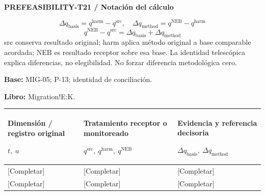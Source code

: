\Needspace{112mm}
\par\begingroup\sffamily\fontsize{8}{10}\selectfont\color{NEBGreen}\setlength{\parskip}{2pt}\setlength{\abovedisplayskip}{4pt}\setlength{\belowdisplayskip}{4pt}\setlength{\abovedisplayshortskip}{2pt}\setlength{\belowdisplayshortskip}{3pt}
\textbf{PREFEASIBILITY-T21 / Notación del cálculo}\par
{\fontsize{9}{11}\selectfont\[ \Delta q_{\mathrm{basis}}=q^{\mathrm{harm}}-q^{\mathrm{src}},\quad \Delta q_{\mathrm{method}}=q^{\mathrm{NEB}}-q^{\mathrm{harm}} \]}
{\fontsize{9}{11}\selectfont\[ q^{\mathrm{NEB}}-q^{\mathrm{src}}=\Delta q_{\mathrm{basis}}+\Delta q_{\mathrm{method}} \]}
src conserva resultado original; harm aplica método original a base comparable acordada; NEB es resultado receptor sobre esa base. La identidad telescópica explica diferencias, no elegibilidad. No forzar diferencia metodológica cero.\par
\textbf{Base:} MIG-05; P-13; identidad de conciliación.\par
\textbf{Libro:} Migration!E:K.\par\endgroup
{\sffamily\fontsize{8.3}{10.3}\selectfont\begin{longtable}{@{}P{54.83mm} P{54.83mm} P{54.83mm}@{}}
\toprule
\textbf{Dimensión / registro original}\par {\normalfont\fontsize{8.2}{10}\selectfont $t,\ u$} & \textbf{Tratamiento receptor o monitoreado}\par {\normalfont\fontsize{8.2}{10}\selectfont $q^{\mathrm{src}},\ q^{\mathrm{harm}},\ q^{\mathrm{NEB}}$} & \textbf{Evidencia y referencia decisoria}\par {\normalfont\fontsize{8.2}{10}\selectfont $\Delta q_{\mathrm{basis}},\ \Delta q_{\mathrm{method}}$}\\\midrule\endhead
\rule{0pt}{8mm}[Completar] & [Completar] & [Completar]\\\hline
\rule{0pt}{8mm}[Completar] & [Completar] & [Completar]\\\hline
\end{longtable}}

